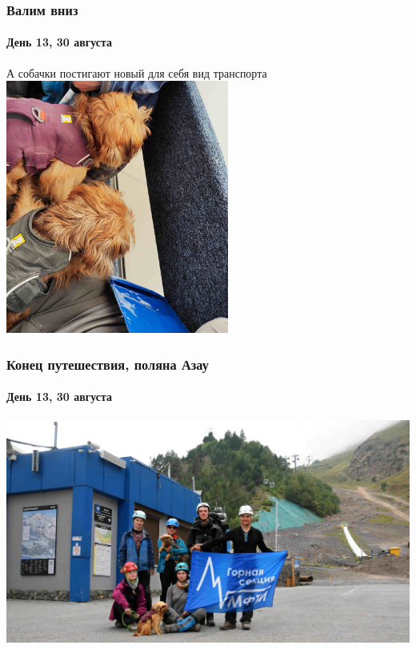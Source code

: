 \begin{frame}
	\frametitle{Валим вниз}
	\framesubtitle{День 13, 30 августа}
	\scriptsize А собачки постигают новый для себя вид транспорта
	\centering
	\includegraphics[width=0.55\textwidth]{../pics/IMG_20240830_170232}			
\end{frame}

\begin{frame}
	\frametitle{Конец путешествия, поляна Азау}
	\framesubtitle{День 13, 30 августа}	
	\centering
	\includegraphics[width=\textwidth]{../pics/group_finish.jpg}			
\end{frame}